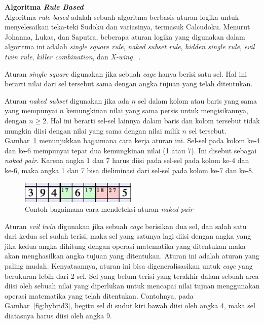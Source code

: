 \documentclass[a4paper,twoside]{article}
\begin{document}
\begin{enumerate}
\textbf{Algoritma \textit{Rule Based}} \\

Algoritma \textit{rule based} adalah sebuah algoritma berbasis aturan logika untuk menyelesaikan teka-teki Sudoku dan variasinya, termasuk Calcudoku. Menurut Johanna, Lukas, dan Saputra, beberapa aturan logika yang digunakan dalam algoritma ini adalah \textit{single square rule}, \textit{naked subset rule}, \textit{hidden single rule}, \textit{evil twin rule}, \textit{killer combination}, dan \textit{X-wing} ~\cite{JohannaLukasSaputra}.

Aturan \textit{single square} digunakan jika sebuah \textit{cage} hanya berisi satu sel. Hal ini berarti nilai dari sel tersebut sama dengan angka tujuan yang telah ditentukan.

Aturan \textit{naked subset} digunakan jika ada \begin{math}n\end{math} sel dalam kolom atau baris yang sama yang mempunyai \begin{math}n\end{math} kemungkinan nilai yang sama persis untuk mengisikannya, dengan \begin{math}n \geq 2 \end{math}. Hal ini berarti sel-sel lainnya dalam baris dan kolom tersebut tidak mungkin diisi dengan nilai yang sama dengan nilai milik \begin{math}n\end{math} sel tersebut. Gambar~\ref{fig:hybrid2} menunjukkan bagaimana cara kerja aturan ini. Sel-sel pada kolom ke-4 dan ke-6 mempunyai tepat dua kemungkinan nilai (1 atau 7). Ini disebut sebagai \textit{naked pair}. Karena angka 1 dan 7 harus diisi pada sel-sel pada kolom ke-4 dan ke-6, maka angka 1 dan 7 bisa dieliminasi dari sel-sel pada kolom ke-7 dan ke-8.

\begin{figure}
\centering
\captionsetup{justification=centering}
\includegraphics[scale=1]{Gambar/HybridGenetic2}
\caption[Contoh bagaimana cara mendeteksi aturan  \textit{naked pair}  ~\cite{JohannaLukasSaputra}]{Contoh bagaimana cara mendeteksi aturan  \textit{naked pair}  ~\cite{JohannaLukasSaputra}}
\label{fig:hybrid2}
\end{figure}

Aturan \textit{evil twin} digunakan jika sebuah \textit{cage} berisikan dua sel, dan salah satu dari kedua sel sudah terisi, maka sel yang satunya lagi diisi dengan angka yang jika kedua angka dihitung dengan operasi matematika yang ditentukan maka akan menghasilkan angka tujuan yang ditentukan. Aturan ini adalah aturan yang paling mudah. Kenyataannya, aturan ini bisa digeneralisasikan untuk \textit{cage} yang berukuran lebih dari 2 sel. Sel yang belum terisi yang terakhir dalam sebuah area diisi oleh sebuah nilai yang diperlukan untuk mencapai nilai tujuan menggunakan operasi matematika yang telah ditentukan. Contohnya, pada Gambar~\ref{fig:hybrid3}, begitu sel di sudut kiri bawah diisi oleh angka 4, maka sel diatasnya harus diisi oleh angka 9.


\end{enumerate}
\end{document}
